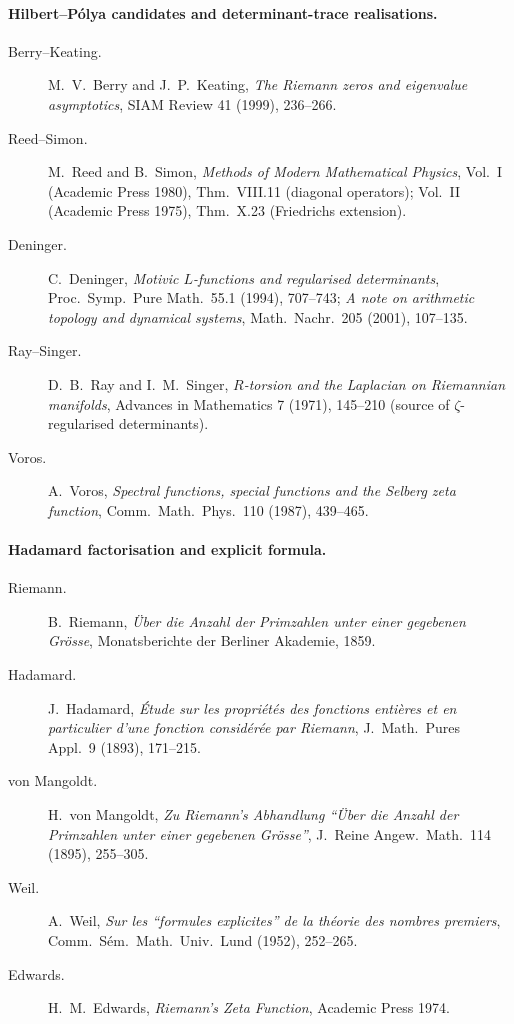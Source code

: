 	\paragraph{Hilbert--P\'olya candidates and determinant-trace realisations.}
\begin{description}
\item[Berry--Keating.] M.~V.~Berry and J.~P.~Keating, \emph{The
Riemann zeros and eigenvalue asymptotics}, SIAM Review 41 (1999),
236--266.
\item[Reed--Simon.] M.~Reed and B.~Simon, \emph{Methods of Modern
Mathematical Physics}, Vol.~I (Academic Press 1980),
Thm.~VIII.11 (diagonal operators); Vol.~II (Academic Press 1975),
Thm.~X.23 (Friedrichs extension).
\item[Deninger.] C.~Deninger, \emph{Motivic \(L\)-functions and
regularised determinants}, Proc.~Symp.~Pure Math.~55.1 (1994),
707--743; \emph{A note on arithmetic topology and dynamical systems},
Math.~Nachr.~205 (2001), 107--135.
\item[Ray--Singer.] D.~B.~Ray and I.~M.~Singer, \emph{\(R\)-torsion
and the Laplacian on Riemannian manifolds}, Advances in
Mathematics 7 (1971), 145--210 (source of \(\zeta\)-regularised
determinants).
\item[Voros.] A.~Voros, \emph{Spectral functions, special functions
and the Selberg zeta function}, Comm.~Math.~Phys.~110 (1987),
439--465.
\end{description}

\paragraph{Hadamard factorisation and explicit formula.}
\begin{description}
\item[Riemann.] B.~Riemann, \emph{\"Uber die Anzahl der Primzahlen
unter einer gegebenen Gr\"osse}, Monatsberichte der Berliner
Akademie, 1859.
\item[Hadamard.] J.~Hadamard, \emph{\'Etude sur les propri\'et\'es
des fonctions enti\`eres et en particulier d'une fonction consid\'er\'ee
par Riemann}, J.~Math.~Pures Appl.~9 (1893), 171--215.
\item[von Mangoldt.] H.~von Mangoldt, \emph{Zu Riemann's Abhandlung
``\"Uber die Anzahl der Primzahlen unter einer gegebenen Gr\"osse''},
J.~Reine Angew.~Math.~114 (1895), 255--305.
\item[Weil.] A.~Weil, \emph{Sur les ``formules explicites'' de la
th\'eorie des nombres premiers}, Comm.~S\'em.~Math.~Univ.~Lund (1952),
252--265.
\item[Edwards.] H.~M.~Edwards, \emph{Riemann's Zeta Function},
Academic Press 1974.
\end{description}

